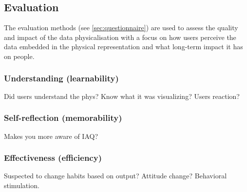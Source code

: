 \subsection{Evaluation}

The evaluation methods (see \ref{sec:questionnaire}) are used to assess the quality and impact of the data physicalisation with a focus on how users perceive the data embedded in the physical representation and what long-term impact it has on people.


\subsubsection{Understanding (learnability)}

Did users understand the phys? Know what it was visualizing? Users reaction?

\subsubsection{Self-reflection (memorability)}

Makes you more aware of IAQ?

\subsubsection{Effectiveness (efficiency)}

Suspected to change habits based on output? Attitude change? Behavioral stimulation.



